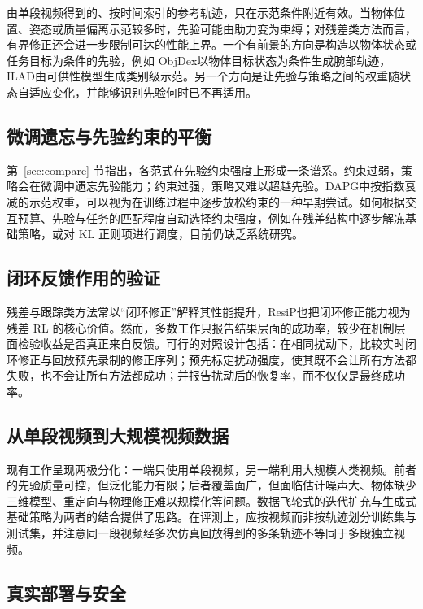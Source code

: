 \documentclass[UTF8,a4paper,zihao=-4]{ctexart}
\begin{document}
由单段视频得到的、按时间索引的参考轨迹，只在示范条件附近有效。当物体位置、姿态或质量偏离示范较多时，先验可能由助力变为束缚；对残差类方法而言，有界修正还会进一步限制可达的性能上界。一个有前景的方向是构造以物体状态或任务目标为条件的先验，例如 ObjDex\cite{objdex}以物体目标状态为条件生成腕部轨迹，ILAD\cite{ilad}由可供性模型生成类别级示范。另一个方向是让先验与策略之间的权重随状态自适应变化，并能够识别先验何时已不再适用。

\subsection{微调遗忘与先验约束的平衡}

第~\ref{sec:compare} 节指出，各范式在先验约束强度上形成一条谱系。约束过弱，策略会在微调中遗忘先验能力\cite{wolczyk}；约束过强，策略又难以超越先验。DAPG\cite{dapg}中按指数衰减的示范权重，可以视为在训练过程中逐步放松约束的一种早期尝试。如何根据交互预算、先验与任务的匹配程度自动选择约束强度，例如在残差结构中逐步解冻基础策略，或对 KL 正则项进行调度，目前仍缺乏系统研究。

\subsection{闭环反馈作用的验证}

残差与跟踪类方法常以“闭环修正”解释其性能提升，ResiP\cite{resip}也把闭环修正能力视为残差 RL 的核心价值。然而，多数工作只报告结果层面的成功率，较少在机制层面检验收益是否真正来自反馈。可行的对照设计包括：在相同扰动下，比较实时闭环修正与回放预先录制的修正序列；预先标定扰动强度，使其既不会让所有方法都失败，也不会让所有方法都成功；并报告扰动后的恢复率，而不仅仅是最终成功率。

\subsection{从单段视频到大规模视频数据}

现有工作呈现两极分化：一端只使用单段视频\cite{human2sim2robot,hudor}，另一端利用大规模人类视频\cite{videodex,hop,r3m}。前者的先验质量可控，但泛化能力有限；后者覆盖面广，但面临估计噪声大、物体缺少三维模型、重定向与物理修正难以规模化等问题。数据飞轮式的迭代扩充\cite{dextrack}与生成式基础策略\cite{hop}为两者的结合提供了思路。在评测上，应按视频而非按轨迹划分训练集与测试集，并注意同一段视频经多次仿真回放得到的多条轨迹不等同于多段独立视频。

\subsection{真实部署与安全}
\end{document}

